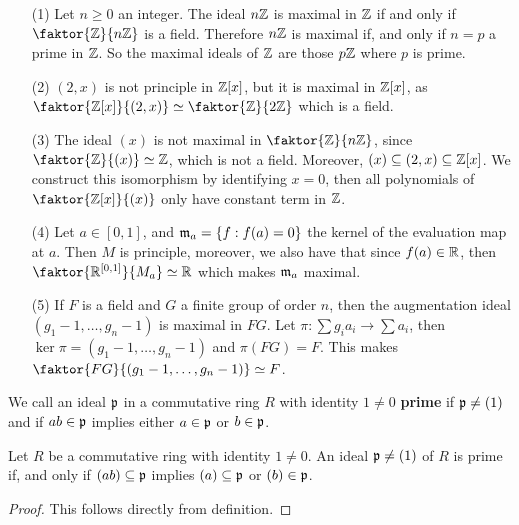 \begin{example}\label{example_5.15}
  \begin{enumerate}
    \item[(1)] Let $n \geq 0$ an integer. The ideal  $n\mathbb{Z}$ is maximal in
      $\mathbb{Z}$ if and only if  $\faktor{\Z}{n\Z}$ is a field. Therefore $n\mathbb{Z}$
      is maximal if, and only if  $n=p$ a prime in $\mathbb{Z}$. So the maximal
      ideals of $\mathbb{Z}$ are those  $p\mathbb{Z}$ where  $p$ is prime.

    \item[(2)] $(2,x)$ is not principle in $\mathbb{Z}[x]$, but it is maximal in
      $\mathbb{Z}[x]$, as $\faktor{\Z[x]}{(2,x)} \simeq \faktor{\Z}{2\Z}$ which
      is a field.

    \item[(3)] The ideal $(x)$ is not maximal in $\faktor{\Z}{n\Z}$, since
      $\faktor{\Z}{(x)} \simeq \Z$, which is not a field. Moreover, $(x)
      \subseteq (2,x) \subseteq \mathbb{Z}[x]$. We construct this isomorphism by
      identifying $x=0$, then all polynomials of $\faktor{\Z[x]}{(x)}$ only
      have constant term in $\mathbb{Z}$.

    \item[(4)] Let $a \in [0,1]$, and $\mathfrak{m}_a=\{f : f(a)=0\}$ the kernel of the
      evaluation map at $a$. Then  $M$ is principle, moreover, we also
      have that since  $f(a) \in \mathbb{R}$, then $\faktor{\R^{[0,1]}}{M_a}
      \simeq \R$ which makes $\mathfrak{m}_a$ maximal.

    \item[(5)] If $F$ is a field and  $G$ a finite group of order $n$, then
      the augmentation ideal  $(g_1-1, \dots, g_n-1)$ is maximal in $FG$.
      Let $\pi:\sum{g_ia_i} \xrightarrow{} \sum{a_i}$, then
      $\ker{\pi}=(g_1-1, \dots, g_n-1)$ and $\pi(FG)=F$. This makes
      $\faktor{FG}{(g_1-1, \dots, g_n-1)} \simeq F$.
  \end{enumerate}
\end{example}

\begin{definition}
  We call an ideal $\mathfrak{p}$ in a commutative ring $R$ with identity  $1
  \neq 0$ \textbf{prime} if $\mathfrak{p} \neq (1)$ and if $ab \in \mathfrak{p}$ implies
  either $a \in \mathfrak{p}$ or $b \in \mathfrak{p}$.
\end{definition}

\begin{lemma}\label{lemma_5.4.4}
  Let $R$ be a commutative ring with identity $1 \neq 0$. An ideal
  $\mathfrak{p} \neq (1)$ of $R$ is prime if, and only if $(ab) \subseteq \mathfrak{p}$
  implies $(a) \subseteq \mathfrak{p}$ or $(b) \in \mathfrak{p}$.
\end{lemma}
\begin{proof}
  This follows directly from definition.
\end{proof}

